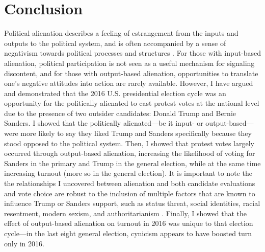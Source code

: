 \documentclass[12pt]{article}
\begin{document}
\section{Conclusion}\label{sec:conclusion}
Political alienation describes a feeling of estrangement from the inputs and outputs to the political system, and is often accompanied by a sense of negativism towards political processes and structures \parencite{horton1962powerlessness}. For those with input-based alienation, political participation is not seen as a useful mechanism for signaling discontent, and for those with output-based alienation, opportunities to translate one's negative attitudes into action are rarely available. However, I have argued and demonstrated that the 2016 U.S. presidential election cycle was an opportunity for the politically alienated to cast protest votes at the national level due to the presence of two outsider candidates: Donald Trump and Bernie Sanders. I showed that the politically alienated---be it input- or output-based---were more likely to say they liked Trump and Sanders specifically because they stood opposed to the political system. Then, I showed that protest votes largely occurred through output-based alienation, increasing the likelihood of voting for Sanders in the primary and Trump in the general election, while at the same time increasing turnout (more so in the general election). It is important to note the the relationships I uncovered between alienation and both candidate evaluations and vote choice are robust to the inclusion of multiple factors that are known to influence Trump or Sanders support, such as status threat, social identities, racial resentment, modern sexism, and authoritarianism \parencite{mutz2018status,sides2018identity,hooghe2018explaining,hopkins2021activation,valentino2018mobilizing,knuckey2020authoritarianism}. Finally, I showed that the effect of output-based alienation on turnout in 2016 was unique to that election cycle---in the last eight general election, cynicism appears to have boosted turn only in 2016. 
\end{document}
